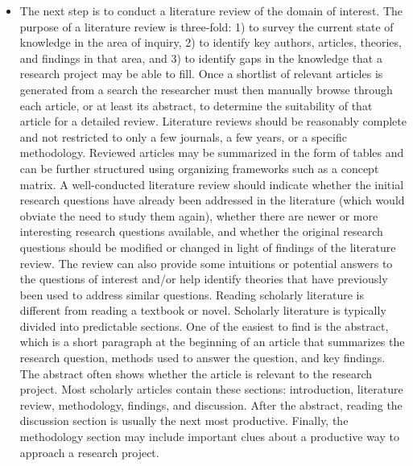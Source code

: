 \begin{enumerate}
\begin{itemize}
	\item The next step is to conduct a literature review of the domain of interest. The purpose of a literature review is three-fold: 1) to survey the current state of knowledge in the area of inquiry, 2) to identify key authors, articles, theories, and findings in that area, and 3) to identify gaps in the knowledge that a research project may be able to fill.  Once a shortlist of relevant articles is generated from a search the researcher must then manually browse through each article, or at least its abstract, to determine the suitability of that	article for a detailed review. Literature reviews should be reasonably complete and not restricted to only a few journals, a few years, or a specific methodology. Reviewed articles may be summarized in the form of tables and can be further structured using organizing frameworks such as a concept matrix. A well-conducted literature review should indicate whether the initial research questions have already been addressed in the literature (which would obviate the	need to study them again), whether there are newer or more interesting research questions available, and whether the original research questions should be modified or changed in light of	findings of the literature review. The review can also provide some intuitions or potential answers to the questions of interest and/or help identify theories that have previously been	used to address similar questions. Reading scholarly literature is different from reading a textbook or novel. Scholarly literature is typically divided into predictable sections. One of the easiest to find is the abstract, which is a short paragraph at the beginning of an article that summarizes the research question, methods used to answer the question, and key findings. The abstract often shows whether the article is relevant to the research project. Most scholarly articles contain these sections: introduction, literature review, methodology, findings, and discussion. After the abstract, reading the discussion section is usually the next most productive. Finally, the methodology section may include important clues about a productive way to approach a research project.
	

\end{itemize}
\end{enumerate}
